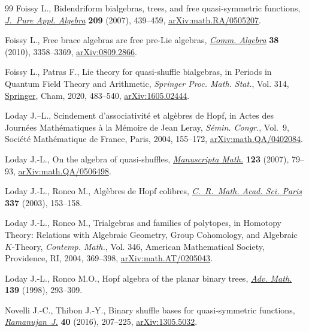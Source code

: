 \begin{thebibliography}{99}
Foissy L., Bidendriform bialgebras, trees, and free quasi-symmetric functions,
 \href{https://doi.org/10.1016/j.jpaa.2006.06.005}{\textit{J.~Pure Appl. Algebra}} \textbf{209} (2007), 439--459,
 \href{https://arxiv.org/abs/math.RA/0505207}{arXiv:math.RA/0505207}.

Foissy L., Free brace algebras are free pre-{L}ie algebras, \href{https://doi.org/10.1080/00927870903115000}{\textit{Comm.
 Algebra}} \textbf{38} (2010), 3358--3369, \href{https://arxiv.org/abs/0809.2866}{arXiv:0809.2866}.

Foissy L., Patras F., Lie theory for quasi-shuffle bialgebras, in Periods in
 {Q}uantum {F}ield {T}heory and {A}rithmetic, \textit{Springer Proc. Math.
 Stat.}, Vol. 314, \href{https://doi.org/10.1007/978-3-030-37031-2_19}{Springer}, Cham, 2020, 483--540, \href{https://arxiv.org/abs/1605.02444}{arXiv:1605.02444}.

Loday J.--L., Scindement d'associativit\'e et alg\`ebres de {H}opf, in Actes des
 {J}ourn\'ees {M}ath\'ematiques \`a la {M}\'emoire de {J}ean {L}eray,
 \textit{S\'emin. Congr.}, Vol.~9, Soci\'et\'e Math\'ematique de France,
 Paris, 2004, 155--172, \href{https://arxiv.org/abs/math.QA/0402084}{arXiv:math.QA/0402084}.

Loday J.-L., On the algebra of quasi-shuffles, \href{https://doi.org/10.1007/s00229-007-0086-2}{\textit{Manuscripta Math.}}
 \textbf{123} (2007), 79--93, \href{https://arxiv.org/abs/math.QA/0506498}{arXiv:math.QA/0506498}.

Loday J.-L., Ronco M., Alg\`ebres de {H}opf colibres, \href{https://doi.org/10.1016/S1631-073X(03)00288-7}{\textit{C.~R.~Math. Acad.
 Sci. Paris}} \textbf{337} (2003), 153--158.

Loday J.-L., Ronco M., Trialgebras and families of polytopes, in Homotopy
 {T}heory: {R}elations with {A}lgebraic {G}eometry, {G}roup {C}ohomology, and
 {A}lgebraic {$K$}-{T}heory, \textit{Contemp. Math.}, Vol. 346, American
 Mathematical Society, Providence, RI, 2004, 369--398,
 \href{https://arxiv.org/abs/math.AT/0205043}{arXiv:math.AT/0205043}.

Loday J.-L., Ronco M.O., Hopf algebra of the planar binary trees, \href{https://doi.org/10.1006/aima.1998.1759}{\textit{Adv.
 Math.}} \textbf{139} (1998), 293--309.

Novelli J.-C., Thibon J.-Y., Binary shuffle bases for quasi-symmetric functions,
 \href{https://doi.org/10.1007/s11139-016-9777-1}{\textit{Ramanujan~J.}} \textbf{40} (2016), 207--225, \href{https://arxiv.org/abs/1305.5032}{arXiv:1305.5032}.


\end{thebibliography}
